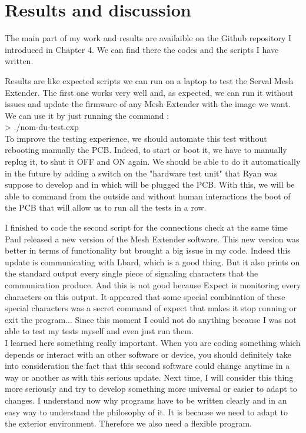 \chapter{Results and discussion}

The main part of my work and results are availaible on the Github repository I introduced in Chapter 4. We can find there the codes and the scripts I have written.
\par
Results are like expected scripts we can run on a laptop to test the Serval Mesh Extender. The first one works very well and, as expected, we can run it without issues and update the firmware of any Mesh Extender with the image we want. We can use it by just running the command :
\\ > ./nom-du-test.exp \\
To improve the testing experience, we should automate this test without rebooting manually the PCB. Indeed, to start or boot it, we have to manually replug it, to shut it OFF and ON again. We should be able to do it automatically in the future by adding a switch on the "hardware test unit" that Ryan was suppose to develop and in which will be plugged the PCB. With this, we will be able to command from the outside and without human interactions the boot of the PCB that will allow us to run all the tests in a row. 

\par
I finished to code the second script for the connections check at the same time Paul released a new version of the Mesh Extender software. This new version was better in terms of functionality but brought a big issue in my code. Indeed this update is communicating with Lbard, which is a good thing. But it also prints on the standard output every single piece of signaling characters that the communication produce. And this is not good because Expect is monitoring every characters on this output. It appeared that some special combination of these special characters was a secret command of expect that makes it stop running or exit the program... Since this moment I could not do anything because I was not able to test my tests myself and even just run them. 
\\
I learned here something really important. When you are coding something which depends or interact with an other software or device, you should definitely take into consideration the fact that this second software could change anytime in a way or another as with this serious update. Next time, I will consider this thing more seriously and try to develop something more universal or easier to adapt to changes. I understand now why programs have to be written clearly and in an easy way to understand the philosophy of it. It is because we need to adapt to the exterior environment. Therefore we also need a flexible program. 

